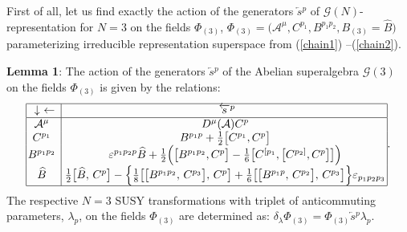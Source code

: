 \documentclass[10pt]{article}
\begin{document}
First of all, let us find exactly the action of  the generators $\overleftarrow{s}{}^{p}$ of  $\mathcal{G}(N)$-representation for  $N=3$ on the fields $\Phi_{(3)}$, $\Phi_{(3)}=\big(\mathcal{A}^\mu, C^{p_1}, B^{p_1p_2}, B_{(3)}= \widehat{B}\big)$ parameterizing irreducible representation superspace from (\ref{chain1}) --(\ref{chain2}).

\noindent
\textbf{Lemma 1}: The action of the generators  $\overleftarrow{s}{}^{p}$ of the Abelian superalgebra $\mathcal{G}(3)$ on the fields $\Phi_{(3)}$ is given by the relations:
 \begin{equation}\label{minN3}
\begin{array}{|c|c |}\hline%
  \downarrow \  \leftarrow \!&\!  \overleftarrow{s}{}^{p}\!\! \!\! \\
   \hline%
    \! \! \mathcal{A}^\mu &\! D^\mu(\mathcal{A}) C^p \!\!   \\

 \!\! C^{p_1}    &\! B^{p_1p}+%
\textstyle\frac{1}{2}\big[C^{p_1}, C^{p}\big] \!\!   \\
 \!\! B^{p_1p_2}    &\! \varepsilon^{p_1p_2p}\widehat{B}+ \textstyle\frac{1}{2}\Big(
\big[B^{p_1p_2}, C^{p}\big]-\frac{1}{6}\big[C^{[p_1},\big[C^{p_2]},C^{p}\big]\big]\Big) \!\!   \\
    \!\! \widehat{B}    &\! \textstyle\frac{1}{2}\big[\widehat{B},\,C^p\big] - \Big\{\frac{1}{8}\big[\big[B^{p_1p_2},\,C^{p_3}\big],\,C^p\big] +\frac{1}{6} \big[\big[B^{p_1p},\,C^{p_2}\big],\,C^{p_3}\big]\Big\} \varepsilon_{p_1p_2p_3}  \!\!   \\
   \cline{1-2}%
\end{array}. \end{equation}
The respective $N=3$ SUSY transformations with triplet of anticommuting parameters, $\lambda_p$, on the fields $\Phi_{(3)}$  are determined  as: $\delta_\lambda \Phi_{(3)} = \Phi_{(3)} \overleftarrow{s}{}^{p} \lambda_p $.
\end{document}
